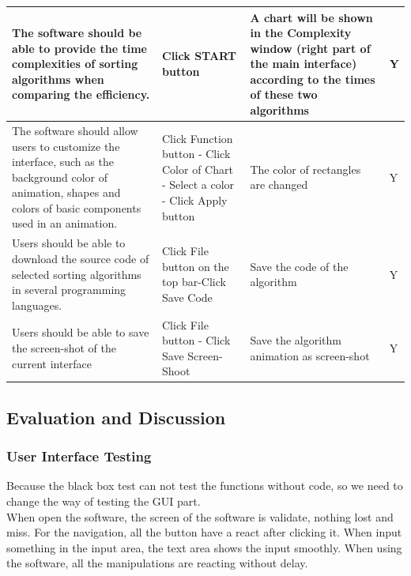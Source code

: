 \documentclass[paper=a4, fontsize=11pt,twoside]{scrartcl}		%
\begin{document}
\begin{table}[H]
\begin{tabular}{|p{4cm}|p{4cm}|p{5cm}|p{0.5cm}|}
\hline
The software should be able to provide the time complexities of sorting algorithms when comparing the efficiency. & Click START button & A chart will be shown in the Complexity window (right part of the main interface) according to the times of these two algorithms & Y \\ \hline
The software should allow users to customize the interface, such as the background color of animation, shapes and colors of basic components used in an animation. & Click Function button - Click Color of Chart - Select a color - Click Apply button & The color of rectangles are changed & Y \\ \hline
Users should be able to download the source code of selected sorting algorithms in several programming languages. & Click File button on the top bar-Click Save Code & Save the code of the algorithm & Y \\ \hline
Users should be able to save the screen-shot of the current interface & Click File button - Click Save Screen-Shoot & Save the algorithm animation as screen-shot & Y \\ \hline
\end{tabular}
\end{table}

\subsection{Evaluation and Discussion}

\subsubsection{User Interface Testing}
Because the black box test can not test the functions without code, so we need to change the way of testing the GUI part.\\
\newline
When open the software, the screen of the software is validate, nothing lost and miss. For the navigation, all the button have a react after clicking it. When input something in the input area, the text area shows the input smoothly. When using the software, all the manipulations are reacting without delay.
\end{document}
